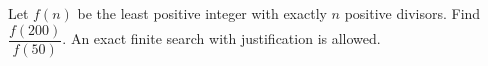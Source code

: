 Let $f(n)$ be the least positive integer with exactly $n$ positive divisors. Find $\dfrac{f(200)}{f(50)}$. An exact finite search with justification is allowed.
